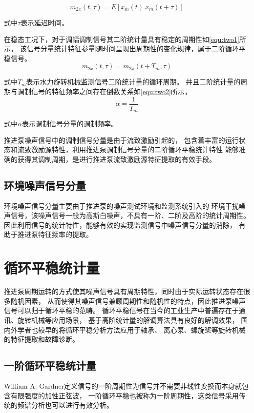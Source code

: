 \begin{equation}
    \label{equ:two}
    m_{2x}\left ( t, \tau \right )  =E\left [ x_{m}\left ( t \right ) \ x_{m}\left ( t+\tau \right )  \right ] 
\end{equation}

式中$\tau$表示延迟时间。

在稳态工况下，对于调幅调制信号其二阶统计量具有稳定的周期性如\autoref{equ:two1}所示，
该信号分量统计特征参量随时间呈现出周期性的变化规律，属于二阶循环平稳信号。
\begin{equation}
    \label{equ:two1}
    m_{2x}\left ( t, \tau \right )  =m_{2x}\left ( t+T_m, \tau \right )
\end{equation}

式中$T_m$表示水力旋转机械监测信号二阶统计量的循环周期。
并且二阶统计量的周期与调制信号的特征频率之间存在倒数关系如\autoref{equ:two2}所示，
\begin{equation}
    \label{equ:two2}
    \alpha =\frac{1}{T_{m} } 
\end{equation}

式中$\alpha$表示调制信号分量的调制频率。 

推进泵噪声信号中的调制信号分量是由于流致激励引起的，
包含着丰富的运行状态和流致激励源特性，利用推进泵调制信号分量的二阶循环平稳统计特性
能够准确的获得其调制周期，是进行推进泵流致激励源特征提取的有效手段。
\subsection{环境噪声信号分量}
环境噪声信号分量主要由于推进泵的噪声测试环境和监测系统引入的
环境干扰噪声信号，该噪声信号一般为高斯白噪声，不具有一阶、二阶及高阶的统计周期性。
因此利用信号的统计特性，能够有效的实现监测信号中噪声信号分量的消除，
有助于推进泵特征频率的提取。

\section{循环平稳统计量}
推进泵周期运转的方式使其噪声信号具有周期特性，同时由于实际运转状态存在很多随机因素，
从而使得其噪声信号兼顾周期性和随机性的特点，因此推进泵噪声信号可以归于循环平稳的范畴。
循环平稳信号在当今的工业生产中普遍存在于通讯、旋转机械等应用场景，
基于高阶统计量的解调算法具有良好的解调效果，
国内外学者也较早的将循环平稳分析方法应用于轴承、
离心泵、螺旋桨等旋转机械的特征提取和故障诊断。
\subsection{一阶循环平稳统计量}
William A. Gardner定义信号的一阶周期性为信号并不需要非线性变换而本身就包含有限强度的加性正弦波，
一阶循环平稳也被称为一阶周期性，这类信号采用传统的频谱分析也可以进行有效分析。

